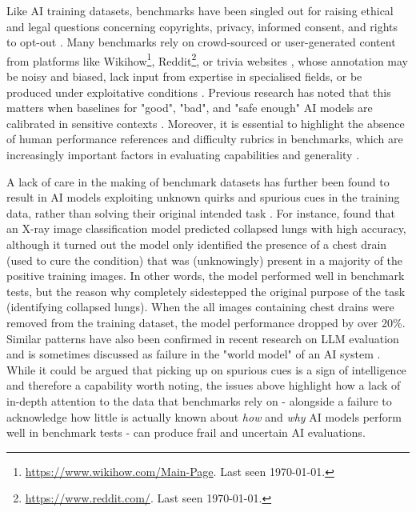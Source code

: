 Like AI training datasets, benchmarks have been singled out for raising ethical and legal questions concerning copyrights, privacy, informed consent, and rights to opt-out \cite{paullada2021}. Many benchmarks rely on crowd-sourced or user-generated content from platforms like Wikihow\footnote{\url{https://www.wikihow.com/Main-Page}. Last seen \today.}, Reddit\footnote{\url{https://www.reddit.com/}. Last seen \today.}, or trivia websites \cite{keegan2024, grill2024}, whose annotation may be noisy and biased, lack input from expertise in specialised fields, or be produced under exploitative conditions \cite{tsipras2020, aroyo2015, sen2015}. Previous research has noted that this matters when baselines for "good", "bad", and "safe enough" AI models are calibrated in sensitive contexts \cite{rauh2024, grill2024}. Moreover, it is essential to highlight the absence of human performance references and difficulty rubrics in benchmarks, which are increasingly important factors in evaluating capabilities and generality \cite{chollet2019}.

A lack of care in the making of benchmark datasets has further been found to result in AI models exploiting unknown quirks and spurious cues in the training data, rather than solving their original intended task \cite{liao2021, paullada2021, geirhos_shortcut_2020}.%
For instance, \citet{oakden-rayner2019} found that an X-ray image classification model predicted collapsed lungs with high accuracy, although it turned out the model only identified the presence of a chest drain (used to cure the condition) that was (unknowingly) present in a majority of the positive training images. In other words, the model performed well in benchmark tests, but the reason why completely sidestepped the original purpose of the task (identifying collapsed lungs). When the all images containing chest drains were removed from the training dataset, the model performance dropped by over 20\%.
Similar patterns have also been confirmed in recent research on LLM evaluation \cite{pacchiardi2024} and is sometimes discussed as failure in the "world model" of an AI system \cite{vafa2024}. %
While it could be argued that picking up on spurious cues is a sign of intelligence and therefore a capability worth noting, the issues above highlight how a lack of in-depth attention to the data that benchmarks rely on - alongside a failure to acknowledge how little is actually known about \textit{how} and \textit{why} AI models perform well in benchmark tests - can produce frail and uncertain AI evaluations.


